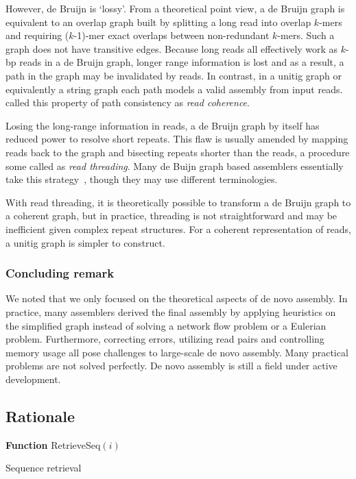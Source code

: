 \documentclass{bioinfo}
\begin{document}
\begin{methods}
However, de Bruijn is `lossy'. From a theoretical point view, a de Bruijn graph
is equivalent to an overlap graph built by splitting a long read into overlap
$k$-mers and requiring ($k$-1)-mer exact overlaps between non-redundant
$k$-mers.  Such a graph does not have transitive edges. Because long reads all
effectively work as $k$-bp reads in a de Bruijn graph, longer range information
is lost and as a result, a path in the graph may be invalidated by reads. In
contrast, in a unitig graph or equivalently a string graph each path models a
valid assembly from input reads. \citet{Myers:2005bh} called this property of
path consistency as \emph{read coherence}.

Losing the long-range information in reads, a de Bruijn graph by itself has
reduced power to resolve short repeats. This flaw is usually amended by mapping
reads back to the graph and bisecting repeats shorter than the reads, a procedure
some called as \emph{read threading}. Many de Buijn graph based assemblers
essentially take this
strategy~\citep{Pevzner:2001vn,Chaisson:2009fk,Zerbino:2009ly,Li:2010vn},
though they may use different terminologies.

With read threading, it is theoretically possible to transform a de Bruijn graph
to a coherent graph, but in practice, threading is not straightforward and
may be inefficient given complex repeat structures. For a coherent representation
of reads, a unitig graph is simpler to construct.

\subsubsection{Concluding remark}
We noted that we only focused on the theoretical aspects of de novo assembly.
In practice, many assemblers derived the final assembly by applying heuristics
on the simplified graph instead of solving a network flow problem or a Eulerian
problem. Furthermore, correcting errors, utilizing read pairs and controlling memory
usage all pose challenges to large-scale de novo assembly. Many practical
problems are not solved perfectly. De novo assembly is still a field under
active development.

\subsection{Rationale}

\begin{algorithm}[h]
\DontPrintSemicolon
\footnotesize
{}
\BlankLine
\textbf{Function} {\sc RetrieveSeq}$(i)$
\caption{Sequence retrieval}
\end{algorithm}


\end{methods}
\end{document}
